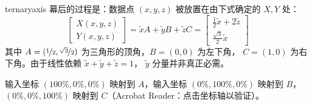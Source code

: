 \begin{environment}{{ternaryaxis}}
    幕后的过程是：数据点 $(x,y,z)$ 被放置在由下式确定的 $X,Y$ 处：
        \[
            \begin{bmatrix}
                X(x,y,z)\\
                Y(x,y,z)
            \end{bmatrix}
            =
            \tilde x A + \tilde y B + \tilde z C
            =
            \begin{bmatrix}
                \frac12 {\tilde x+2 \tilde z}\\
                \frac{\sqrt 3}{2} {\tilde x}
            \end{bmatrix}
        \]
    其中 $A=(\nicefrac12,\nicefrac{\sqrt3}{2})$ 为三角形的顶角，$B=(0,0)$ 为左下角，
    $C=(1,0)$ 为右下角。由于线性依赖 $\tilde x+\tilde y+\tilde z=1$，
    $\tilde y$ 分量并非真正必需。

    输入坐标 $(100\%,0\%,0\%)$ 映射到 $A$，输入坐标 $(0\%,100\%,0\%)$ 映射到 $B$，
    $(0\%,0\%,100\%)$ 映射到 $C$（Acrobat Reader：点击坐标轴以验证）。
\begin{codeexample}[]
\end{codeexample}
\end{environment}

